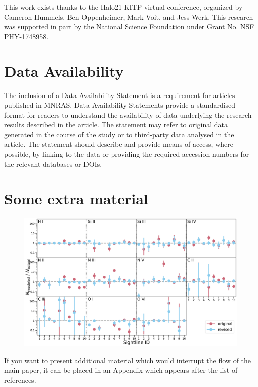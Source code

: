 \documentclass[fleqn,usenatbib]{mnras}
\begin{document}
This work exists thanks to the Halo21 KITP virtual conference, organized by Cameron Hummels, Ben Oppenheimer, Mark Voit, and Jess Werk.
This research was supported in part by the National Science Foundation under Grant No. NSF PHY-1748958.

\section*{Data Availability}
 
The inclusion of a Data Availability Statement is a requirement for articles published in MNRAS. Data Availability Statements provide a standardised format for readers to understand the availability of data underlying the research results described in the article. The statement may refer to original data generated in the course of the study or to third-party data analysed in the article. The statement should describe and provide means of access, where possible, by linking to the data or providing the required accession numbers for the relevant databases or DOIs.







\appendix

\section{Some extra material}

\begin{figure}
    \centering
    \includegraphics[width=\textwidth]{figures/sample0/column_den.pdf}
    \label{f: column density agreement}
\end{figure}

If you want to present additional material which would interrupt the flow of the main paper,
it can be placed in an Appendix which appears after the list of references.



\bsp	%
\label{lastpage}
\end{document}
